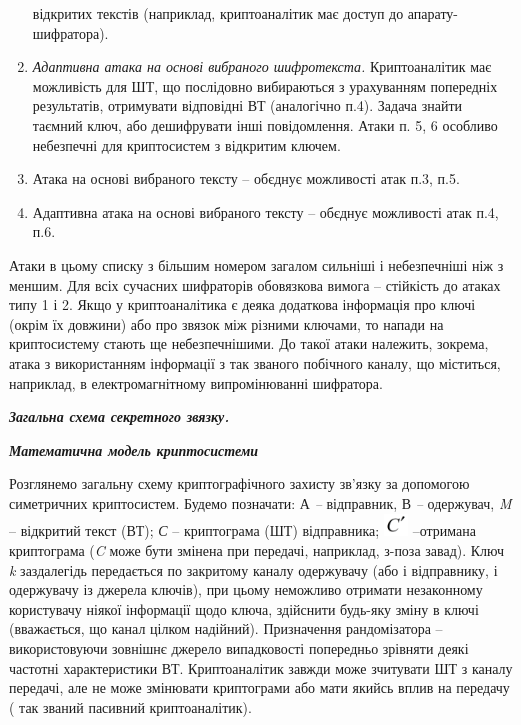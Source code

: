 \documentclass[a4paper]{article}
\newcounter{}
\begin{document}
\begin{enumerate}
відкритих текстів (наприклад, криптоаналітик має доступ до апарату-шифратора).
\item \textit{Адаптивна атака на основі вибраного шифротекста.} Криптоаналітик
має можливість для ШТ, що послідовно вибираються з урахуванням попередніх
результатів,  отримувати відповідні ВТ (аналогічно п.4). Задача знайти таємний
ключ, або дешифрувати інші повідомлення. Атаки п. 5, 6 особливо небезпечні для
криптосистем з відкритим ключем.
\item Атака на основі вибраного тексту  – об{\textquotesingle}єднує можливості
атак п.3, п.5.
\item Адаптивна атака на основі вибраного тексту  – об{\textquotesingle}єднує
можливості атак п.4, п.6.
\end{enumerate}

\bigskip

 Атаки в цьому списку з більшим номером загалом сильніші і небезпечніші  ніж з
меншим. Для всіх сучасних шифраторів обов{\textquotesingle}язкова вимога –
стійкість до атаках типу 1 і 2. Якщо у криптоаналітика є деяка додаткова
інформація про ключі (окрім їх довжини) або про зв{\textquotesingle}язок між
різними ключами, то напади на криптосистему  стають ще небезпечнішими. До такої
атаки належить, зокрема, атака з використанням інформації з так званого
побічного каналу, що міститься, наприклад, в електромагнітному випромінюванні
шифратора.


\bigskip


\bigskip

{\centering\bfseries\itshape
Загальна схема секретного зв{\textquotesingle}язку.
\par}

{\centering\bfseries\itshape
 Математична модель криптосистеми
\par}


\bigskip


\bigskip

Розглянемо загальну схему криптографічного захисту зв’язку за допомогою
симетричних криптосистем.  Будемо позначати: А \textit{– }відправник, В
\textit{– }одержувач, \textit{M}\textit{ }– відкритий текст (ВТ);
\textit{С}\textit{ }– криптограма (ШТ) відправника; 
\includegraphics[width=0.252in,height=0.2398in]{crypt-img/crypt-img3.png} 
–отримана криптограма (\textit{C}\textit{ }може бути змінена при передачі,
наприклад, з-поза завад). Ключ \textit{k }заздалегідь передається по закритому
каналу одержувачу (або і відправнику, і одержувачу із джерела ключів), при
цьому неможливо отримати незаконному користувачу ніякої інформації щодо ключа,
здійснити будь-яку зміну в ключі  (вважається, що канал цілком надійний).
Призначення рандомізатора – використовуючи  зовнішнє джерело випадковості
попередньо зрівняти деякі частотні характеристики ВТ.  Криптоаналітик завжди
може зчитувати ШТ з каналу передачі, але не може змінювати криптограми або мати
якийсь вплив на передачу ( так званий пасивний криптоаналітик).
\end{document}
